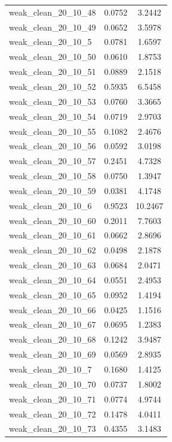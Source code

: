\begin{longtable}{lcc}
weak\_clean\_20\_10\_48    &   0.0752 &  3.2442 \\
weak\_clean\_20\_10\_49    &   0.0652 &  3.5978 \\
weak\_clean\_20\_10\_5     &   0.0781 &  1.6597 \\
weak\_clean\_20\_10\_50    &   0.0610 &  1.8753 \\
weak\_clean\_20\_10\_51    &   0.0889 &  2.1518 \\
weak\_clean\_20\_10\_52    &   0.5935 &  6.5458 \\
weak\_clean\_20\_10\_53    &   0.0760 &  3.3665 \\
weak\_clean\_20\_10\_54    &   0.0719 &  2.9703 \\
weak\_clean\_20\_10\_55    &   0.1082 &  2.4676 \\
weak\_clean\_20\_10\_56    &   0.0592 &  3.0198 \\
weak\_clean\_20\_10\_57    &   0.2451 &  4.7328 \\
weak\_clean\_20\_10\_58    &   0.0750 &  1.3947 \\
weak\_clean\_20\_10\_59    &   0.0381 &  4.1748 \\
weak\_clean\_20\_10\_6     &   0.9523 & 10.2467 \\
weak\_clean\_20\_10\_60    &   0.2011 &  7.7603 \\
weak\_clean\_20\_10\_61    &   0.0662 &  2.8696 \\
weak\_clean\_20\_10\_62    &   0.0498 &  2.1878 \\
weak\_clean\_20\_10\_63    &   0.0684 &  2.0471 \\
weak\_clean\_20\_10\_64    &   0.0551 &  2.4953 \\
weak\_clean\_20\_10\_65    &   0.0952 &  1.4194 \\
weak\_clean\_20\_10\_66    &   0.0425 &  1.1516 \\
weak\_clean\_20\_10\_67    &   0.0695 &  1.2383 \\
weak\_clean\_20\_10\_68    &   0.1242 &  3.9487 \\
weak\_clean\_20\_10\_69    &   0.0569 &  2.8935 \\
weak\_clean\_20\_10\_7     &   0.1680 &  1.4125 \\
weak\_clean\_20\_10\_70    &   0.0737 &  1.8002 \\
weak\_clean\_20\_10\_71    &   0.0774 &  4.9744 \\
weak\_clean\_20\_10\_72    &   0.1478 &  4.0411 \\
weak\_clean\_20\_10\_73    &   0.4355 &  3.1483 \\

\end{longtable}

